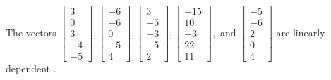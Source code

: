 \begin{exercise}
\begin{exerciseStatement}
  \end{exerciseStatement}
  \begin{exerciseAnswer}
   The vectors \(\left[\begin{array}{r}
3 \\
0 \\
3 \\
-4 \\
-5
\end{array}\right] , \left[\begin{array}{r}
-6 \\
-6 \\
0 \\
-5 \\
4
\end{array}\right] , \left[\begin{array}{r}
3 \\
-5 \\
-3 \\
-5 \\
2
\end{array}\right] , \left[\begin{array}{r}
-15 \\
10 \\
-3 \\
22 \\
11
\end{array}\right] , \text{ and } \left[\begin{array}{r}
-5 \\
-6 \\
2 \\
0 \\
4
\end{array}\right]\) are 
  	 linearly dependent  .
  


  \end{exerciseAnswer}
\end{exercise}